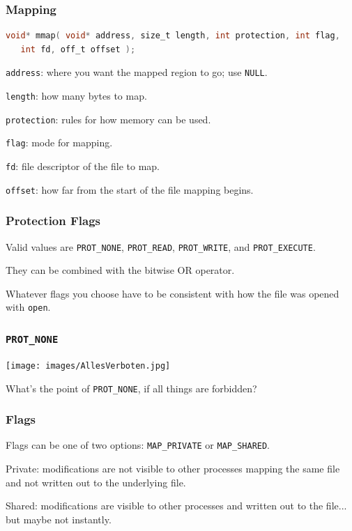 \begin{frame}[fragile]
	\frametitle{Mapping}
	\begin{lstlisting}[language=C]
void* mmap( void* address, size_t length, int protection, int flag,
   int fd, off_t offset );
\end{lstlisting}

	\texttt{address}: where you want the mapped region to go; use \texttt{NULL}.

	\texttt{length}: how many bytes to map.

	\texttt{protection}: rules for how memory can be used.

	\texttt{flag}: mode for mapping.

	\texttt{fd}: file descriptor of the file to map.

	\texttt{offset}: how far from the start of the file mapping begins.

\end{frame}


\begin{frame}
	\frametitle{Protection Flags}

	Valid values are \texttt{PROT\_NONE}, \texttt{PROT\_READ}, \texttt{PROT\_WRITE}, and \texttt{PROT\_EXECUTE}.

	They can be combined with the bitwise OR operator.

	Whatever flags you choose have to be consistent with how the file was opened with \texttt{open}.

\end{frame}


\begin{frame}
	\frametitle{\texttt{PROT\_NONE}}

	\begin{center}
		\texttt{[image: images/AllesVerboten.jpg]}
	\end{center}

	What's the point of \texttt{PROT\_NONE}, if all things are forbidden?

\end{frame}


\begin{frame}
	\frametitle{Flags}
	Flags can be one of two options: \texttt{MAP\_PRIVATE} or \texttt{MAP\_SHARED}.

	Private: modifications are not visible to other processes mapping the same file and not written out to the underlying file.

	Shared: modifications are visible to other processes and written out to the file... but maybe not instantly.

\end{frame}


